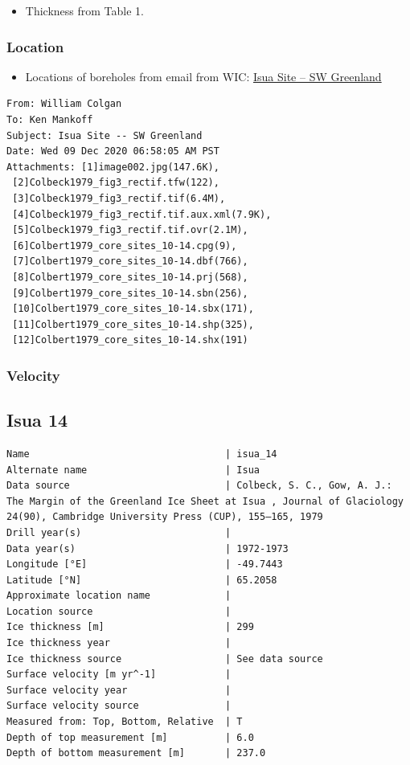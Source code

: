 \documentclass[article,a4paper,times,11pt,twoside]{article}
\begin{document}
\begin{itemize}
\item Thickness from \textcite{colbeck_1979} Table 1.
\end{itemize}

\subsubsection{Location}
\label{sec:org3469543}

\begin{itemize}
\item Locations of boreholes from email from WIC: \href{msgid:AM0PR04MB6129F131ECD9123E72752945A2CC0@AM0PR04MB6129.eurprd04.prod.outlook.com}{Isua Site -- SW Greenland}
\end{itemize}

\begin{verbatim}
From: William Colgan
To: Ken Mankoff
Subject: Isua Site -- SW Greenland
Date: Wed 09 Dec 2020 06:58:05 AM PST
Attachments: [1]image002.jpg(147.6K),
 [2]Colbeck1979_fig3_rectif.tfw(122),
 [3]Colbeck1979_fig3_rectif.tif(6.4M),
 [4]Colbeck1979_fig3_rectif.tif.aux.xml(7.9K),
 [5]Colbeck1979_fig3_rectif.tif.ovr(2.1M),
 [6]Colbert1979_core_sites_10-14.cpg(9),
 [7]Colbert1979_core_sites_10-14.dbf(766),
 [8]Colbert1979_core_sites_10-14.prj(568),
 [9]Colbert1979_core_sites_10-14.sbn(256),
 [10]Colbert1979_core_sites_10-14.sbx(171),
 [11]Colbert1979_core_sites_10-14.shp(325),
 [12]Colbert1979_core_sites_10-14.shx(191)
\end{verbatim}

\subsubsection{Velocity}
\label{sec:org0ed6bba}
\clearpage
\subsection{Isua 14}
\label{sec:org3c4eefc}
\begin{verbatim}
Name                                  | isua_14
Alternate name                        | Isua
Data source                           | Colbeck, S. C., Gow, A. J.: The Margin of the Greenland Ice Sheet at Isua , Journal of Glaciology 24(90), Cambridge University Press (CUP), 155–165, 1979 
Drill year(s)                         | 
Data year(s)                          | 1972-1973
Longitude [°E]                        | -49.7443
Latitude [°N]                         | 65.2058
Approximate location name             | 
Location source                       | 
Ice thickness [m]                     | 299
Ice thickness year                    | 
Ice thickness source                  | See data source
Surface velocity [m yr^-1]            | 
Surface velocity year                 | 
Surface velocity source               | 
Measured from: Top, Bottom, Relative  | T
Depth of top measurement [m]          | 6.0
Depth of bottom measurement [m]       | 237.0
\end{verbatim}
\end{document}
